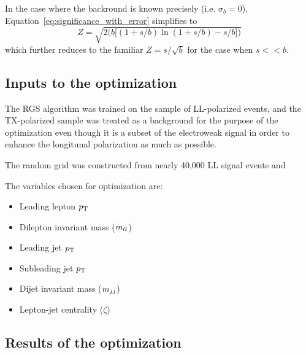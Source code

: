 In the case where the backround is known precisely (i.e. $\sigma_b = 0$), Equation~\ref{eq:significance_with_error} simplifies to
\begin{equation}
Z = \sqrt{2\bigg(b\big[(1+s/b)\ln(1+s/b)-s/b\big]\bigg)}
\label{eq:significance_without_error}
\end{equation}
which further reduces to the familiar $Z = s/\sqrt{b}$ for the case when $s << b$.

\subsection{Inputs to the optimization}\label{sswwupgrade:opt_inputs}

The RGS algorithm was trained on the sample of LL-polarized \ssww events, and the TX-polarized sample was treated as a background for the purpose of the optimization even though it is a subset of the \ssww electroweak signal in order to enhance the longitunal polarization as much as possible.

The random grid was constructed from nearly 40,000 LL signal events and 

The variables chosen for optimization are:
\begin{itemize}
\item Leading lepton $p_{\mathrm{T}}$
\item Dilepton invariant mass ($m_{ll}$)
\item Leading jet $p_{\mathrm{T}}$
\item Subleading jet $p_{\mathrm{T}}$
\item Dijet invariant mass ($m_{jj}$)
\item Lepton-jet centrality ($\zeta$)
\end{itemize}

\subsection{Results of the optimization}\label{sswwupgrade:opt_results}

